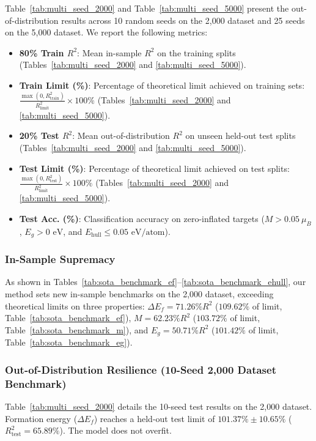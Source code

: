 \documentclass[journal=jcisd8,manuscript=article]{achemso}
\begin{document}
Table~\ref{tab:multi_seed_2000} and Table~\ref{tab:multi_seed_5000} present the out-of-distribution results across 10 random seeds on the 2,000 dataset and 25 seeds on the 5,000 dataset. We report the following metrics:
\begin{itemize}
\item \textbf{80\% Train $R^2$}: Mean in-sample $R^2$ on the training splits (Tables~\ref{tab:multi_seed_2000} and \ref{tab:multi_seed_5000}).
\item \textbf{Train Limit (\%)}: Percentage of theoretical limit achieved on training sets: $\frac{\max(0, R^2_{\text{train}})}{R^2_{\text{limit}}} \times 100\%$ (Tables~\ref{tab:multi_seed_2000} and \ref{tab:multi_seed_5000}).
\item \textbf{20\% Test $R^2$}: Mean out-of-distribution $R^2$ on unseen held-out test splits (Tables~\ref{tab:multi_seed_2000} and \ref{tab:multi_seed_5000}).
\item \textbf{Test Limit (\%)}: Percentage of theoretical limit achieved on test splits: $\frac{\max(0, R^2_{\text{test}})}{R^2_{\text{limit}}} \times 100\%$ (Tables~\ref{tab:multi_seed_2000} and \ref{tab:multi_seed_5000}).
\item \textbf{Test Acc. (\%)}: Classification accuracy on zero-inflated targets ($M > 0.05\ \mu_B$, $E_g > 0\text{ eV}$, and $E_{\text{hull}} \le 0.05\text{ eV/atom}$).
\end{itemize}

\subsubsection{In-Sample Supremacy}
As shown in Tables~\ref{tab:sota_benchmark_ef}--\ref{tab:sota_benchmark_ehull}, our method sets new in-sample benchmarks on the 2,000 dataset, exceeding theoretical limits on three properties: $\Delta E_f = 71.26\% R^2$ ($109.62\%$ of limit, Table~\ref{tab:sota_benchmark_ef}), $M = 62.23\% R^2$ ($103.72\%$ of limit, Table~\ref{tab:sota_benchmark_m}), and $E_g = 50.71\% R^2$ ($101.42\%$ of limit, Table~\ref{tab:sota_benchmark_eg}).

\subsubsection{Out-of-Distribution Resilience (10-Seed 2,000 Dataset Benchmark)}
Table~\ref{tab:multi_seed_2000} details the 10-seed test results on the 2,000 dataset. Formation energy ($\Delta E_f$) reaches a held-out test limit of \textbf{$101.37\% \pm 10.65\%$} ($R^2_{\text{test}} = 65.89\%$). The model does not overfit.
\end{document}

